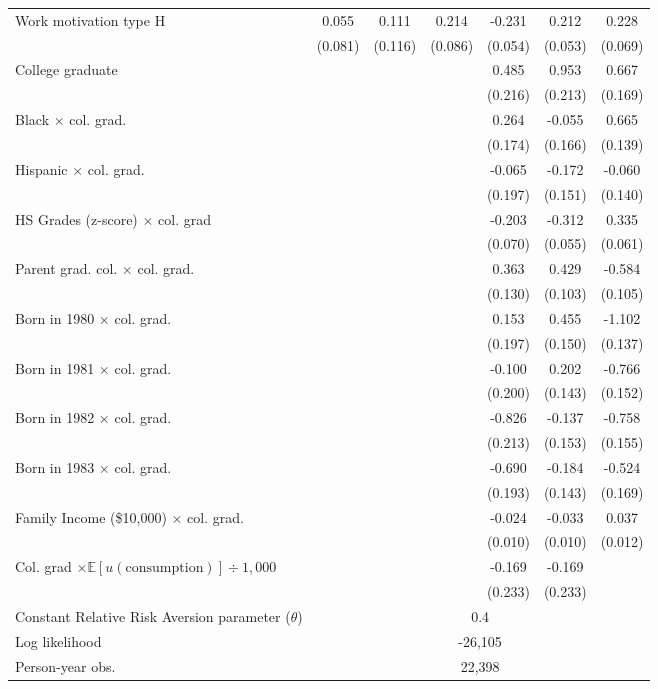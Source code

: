 \begin{landscape}
\begin{ThreePartTable}
\begin{longtable}{lcccccc}
Work motivation type H & 0.055 & 0.111 & 0.214 & -0.231 & 0.212 & 0.228 \\ 
 & (0.081) & (0.116) & (0.086) & (0.054) & (0.053) & (0.069) \\ 
College graduate &  &  &  & 0.485 & 0.953 & 0.667 \\ 
 &  &  &  & (0.216) & (0.213) & (0.169) \\ 
Black $\times$ col. grad. &  &  &  & 0.264 & -0.055 & 0.665 \\ 
 &  &  &  & (0.174) & (0.166) & (0.139) \\ 
Hispanic $\times$ col. grad. &  &  &  & -0.065 & -0.172 & -0.060 \\ 
 &  &  &  & (0.197) & (0.151) & (0.140) \\ 
HS Grades (z-score) $\times$ col. grad &  &  &  & -0.203 & -0.312 & 0.335 \\ 
 &  &  &  & (0.070) & (0.055) & (0.061) \\ 
Parent grad. col. $\times$ col. grad. &  &  &  & 0.363 & 0.429 & -0.584 \\ 
 &  &  &  & (0.130) & (0.103) & (0.105) \\ 
Born in 1980 $\times$ col. grad. &  &  &  & 0.153 & 0.455 & -1.102 \\ 
 &  &  &  & (0.197) & (0.150) & (0.137) \\ 
Born in 1981 $\times$ col. grad. &  &  &  & -0.100 & 0.202 & -0.766 \\ 
 &  &  &  & (0.200) & (0.143) & (0.152) \\ 
Born in 1982 $\times$ col. grad. &  &  &  & -0.826 & -0.137 & -0.758 \\ 
 &  &  &  & (0.213) & (0.153) & (0.155) \\ 
Born in 1983 $\times$ col. grad. &  &  &  & -0.690 & -0.184 & -0.524 \\ 
 &  &  &  & (0.193) & (0.143) & (0.169) \\ 
Family Income (\$10,000) $\times$ col. grad. &  &  &  & -0.024 & -0.033 & 0.037 \\ 
 &  &  &  & (0.010) & (0.010) & (0.012) \\ 
Col. grad $\times\mathbb{E}[u(\text{consumption})] \div 1,000$ &  &  &  & -0.169 & -0.169 &  \\ 
 &  &  &  & (0.233) & (0.233) &  \\ 
\midrule
Constant Relative Risk Aversion parameter ($\theta$) & \multicolumn{6}{c}{ 0.4} \\ 
Log likelihood & \multicolumn{6}{c}{-26,105} \\ 
Person-year obs. & \multicolumn{6}{c}{22,398} \\ 
\bottomrule
\end{longtable}
\end{ThreePartTable}
\end{landscape}
